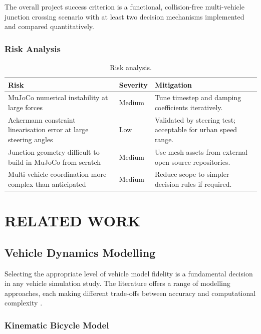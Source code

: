 \documentclass[a4paper,12pt]{report}
\begin{document}
The overall project success criterion is a functional, collision-free
multi-vehicle junction crossing scenario with at least two decision mechanisms
implemented and compared quantitatively.

\subsection{Risk Analysis}

\begin{table}[h]
\centering
\caption{Risk analysis.}
\begin{tabular}{|p{5.2cm}|l|p{5.8cm}|}
\hline
\textbf{Risk} & \textbf{Severity} & \textbf{Mitigation} \\ \hline
MuJoCo numerical instability at large forces & Medium &
  Tune timestep and damping coefficients iteratively. \\ \hline
Ackermann constraint linearisation error at large steering angles & Low &
  Validated by steering test; acceptable for urban speed range. \\ \hline
Junction geometry difficult to build in MuJoCo from scratch & Medium &
  Use mesh assets from external open-source repositories. \\ \hline
Multi-vehicle coordination more complex than anticipated & Medium &
  Reduce scope to simpler decision rules if required. \\ \hline
\end{tabular}
\label{table:risks}
\end{table}

\chapter{RELATED WORK}

\section{Vehicle Dynamics Modelling}

Selecting the appropriate level of vehicle model fidelity is a fundamental
decision in any vehicle simulation study. The literature offers a range of
modelling approaches, each making different trade-offs between accuracy and
computational complexity \cite{rajamani2012}.

\subsection{Kinematic Bicycle Model}
\end{document}
